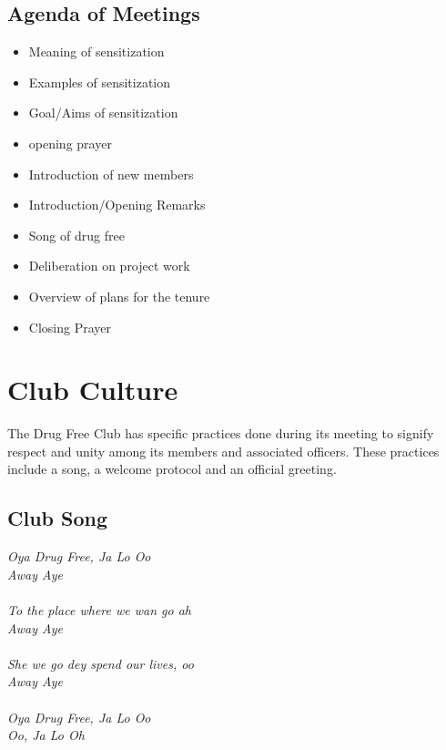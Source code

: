 \documentclass{report}
\begin{document}
\subsection{Agenda of Meetings}
\begin{itemize}
    \item Meaning of sensitization 
    
    \item Examples of sensitization  
    
    \item Goal/Aims of sensitization 
    
    \item opening prayer 
    
    \item Introduction of new members
    
    \item Introduction/Opening Remarks 
    
    \item Song of drug free 
    
    \item Deliberation on project work
    
    \item Overview of plans for the tenure
    
    \item Closing Prayer
\end{itemize}

\section{Club Culture}
The Drug Free Club has specific practices done during its meeting to signify respect and unity among its members and associated officers. These practices include a song, a welcome protocol and an official greeting.

\subsection{Club Song}
\textit{Oya Drug Free, Ja Lo Oo\\
Away Aye\\
\\
To the place where we wan go ah\\
Away Aye\\
\\
She we go dey spend our lives, oo\\
Away Aye\\
\\
Oya Drug Free, Ja Lo Oo\\
Oo, Ja Lo Oh\\
}
\end{document}
